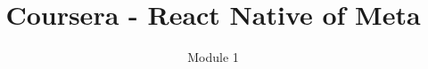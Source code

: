 \documentclass[english]{reportDoCS2025}
\title{Coursera - React Native of Meta}
\subtitle{Module 1}
\begin{document}
\cover

\contents
\listImages
% 





% 
% 
% 
% 
% 

\end{document}
